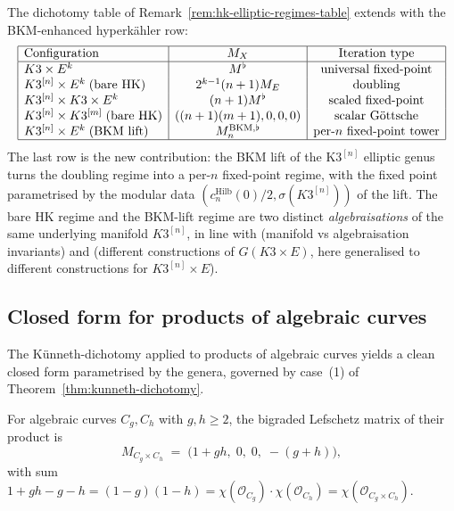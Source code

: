 \begin{remark}
\label{rem:hk-elliptic-regimes-table-bkm-extended}
The dichotomy table of
Remark~\ref{rem:hk-elliptic-regimes-table} extends with the BKM-enhanced
hyperk\"ahler row:
\[
\begin{array}{|l|c|c|}
\hline
\text{Configuration} & M_X & \text{Iteration type} \\
\hline
K3 \times E^k & M^{\flat} & \text{universal fixed-point} \\
K3^{[n]} \times E^k \;(\text{bare HK}) & 2^{k - 1}(n + 1) M_E & \text{doubling} \\
K3^{[n]} \times K3 \times E^k & (n + 1) M^{\flat} & \text{scaled fixed-point} \\
K3^{[n]} \times K3^{[m]} \;(\text{bare HK}) & ((n + 1)(m + 1), 0, 0, 0) & \text{scalar G\"ottsche} \\
K3^{[n]} \times E^k \;(\text{BKM lift}) & M^{\mathrm{BKM}, \flat}_n & \text{per-$n$ fixed-point tower} \\
\hline
\end{array}
\]
The last row is the new contribution: the BKM lift of the K$3^{[n]}$
elliptic genus turns the doubling regime into a per-$n$ fixed-point
regime, with the fixed point parametrised by the modular data
$(c_n^{\mathrm{Hilb}}(0) / 2, \sigma(K3^{[n]}))$ of the lift. The bare
HK regime and the BKM-lift regime are two distinct \emph{algebraisations}
of the same underlying manifold $K3^{[n]}$, in line with
\textup{(}manifold vs algebraisation invariants\textup{)} and
\textup{(}different constructions of $G(K3 \times E)$, here generalised
to different constructions for $K3^{[n]} \times E$\textup{).}
\end{remark}

\subsection{Closed form for products of algebraic curves}
\label{subsec:curve-product-closed-form}

The Künneth-dichotomy applied to products of algebraic curves yields
a clean closed form parametrised by the genera, governed by case~(1)
of Theorem~\ref{thm:kunneth-dichotomy}.

\begin{proposition}[Closed-form bigraded Lefschetz matrix at \texorpdfstring{$C_g \times C_h$}{C-g x C-h}
 for \texorpdfstring{$g, h \geq 2$}{g, h >= 2}]
\label{prop:curve-product-closed-form}
For algebraic curves $C_g, C_h$ with $g, h \geq 2$, the bigraded
Lefschetz matrix of their product is
\[
 \boxed{\;
 M_{C_g \times C_h} \;=\; \bigl(1 + g h,\; 0,\; 0,\; -(g + h)\bigr),
 \;}
\]
with sum $1 + g h - g - h = (1 - g)(1 - h)
= \chi(\mathcal{O}_{C_g}) \cdot \chi(\mathcal{O}_{C_h})
= \chi(\mathcal{O}_{C_g \times C_h})$.
\end{proposition}

